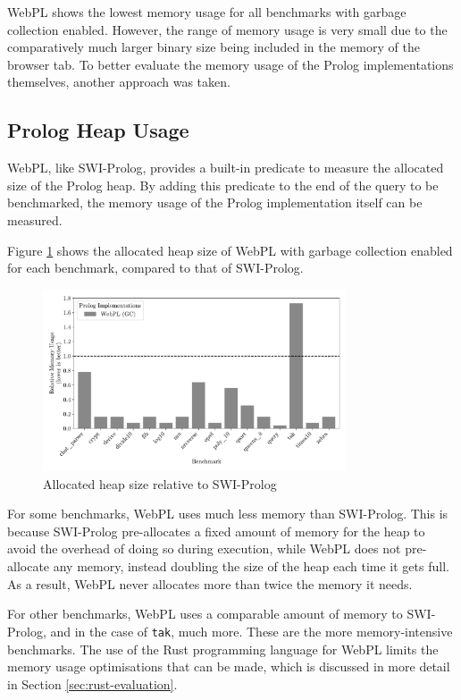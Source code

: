 WebPL shows the lowest memory usage for all benchmarks with garbage collection enabled. However, the range of memory usage is very small due to the comparatively much larger binary size being included in the memory of the browser tab. To better evaluate the memory usage of the Prolog implementations themselves, another approach was taken.

\subsection{Prolog Heap Usage}

\label{sec:prolog-heap-usage}

WebPL, like SWI-Prolog, provides a built-in predicate to measure the allocated size of the Prolog heap. By adding this predicate to the end of the query to be benchmarked, the memory usage of the Prolog implementation itself can be measured.

Figure \ref{fig:heap-usage} shows the allocated heap size of WebPL with garbage collection enabled for each benchmark, compared to that of SWI-Prolog.

\begin{figure}[H]
\centering
\includegraphics[width=0.8\textwidth]{relative_memory_builtin.pdf}
\caption{Allocated heap size relative to SWI-Prolog}
\label{fig:heap-usage}
\end{figure}

For some benchmarks, WebPL uses much less memory than SWI-Prolog. This is because SWI-Prolog pre-allocates a fixed amount of memory for the heap to avoid the overhead of doing so during execution, while WebPL does not pre-allocate any memory, instead doubling the size of the heap each time it gets full. As a result, WebPL never allocates more than twice the memory it needs.

For other benchmarks, WebPL uses a comparable amount of memory to SWI-Prolog, and in the case of \texttt{tak}, much more. These are the more memory-intensive benchmarks. The use of the Rust programming language for WebPL limits the memory usage optimisations that can be made, which is discussed in more detail in Section \ref{sec:rust-evaluation}.

